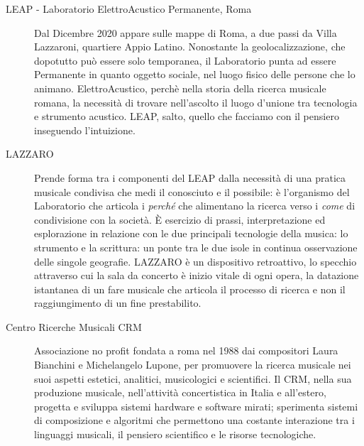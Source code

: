 \documentclass{gs-adonis}
\begin{document}
\begin{description}
  \item[LEAP - Laboratorio ElettroAcustico Permanente, Roma] Dal Dicembre 2020
  appare sulle mappe di Roma, a due passi da Villa Lazzaroni, quartiere Appio
  Latino. Nonostante la geolocalizzazione, che dopotutto può essere solo
  temporanea, il Laboratorio punta ad essere Permanente in quanto oggetto sociale,
  nel luogo fisico delle persone che lo animano. ElettroAcustico, perchè nella
  storia della ricerca musicale romana, la necessità di trovare nell'ascolto
  il luogo d'unione tra tecnologia e strumento acustico. LEAP, salto, quello che
  facciamo con il pensiero inseguendo l'intuizione.

  \item[LAZZARO] Prende forma tra i componenti del LEAP dalla necessità di una
  pratica musicale condivisa che medi il conosciuto e il possibile: è l'organismo
  del Laboratorio che articola i \emph{perché} che alimentano la ricerca verso
  i \emph{come} di condivisione con la società. È esercizio di prassi, interpretazione
  ed esplorazione in relazione con le due principali tecnologie della musica: lo
  strumento e la scrittura: un ponte tra le due isole in continua osservazione
  delle singole geografie. LAZZARO è un dispositivo retroattivo, lo specchio
  attraverso cui la sala da concerto è inizio vitale di ogni opera, la datazione
  istantanea di un fare musicale che articola il processo di ricerca e non il
  raggiungimento di un fine prestabilito.
  \item[Centro Ricerche Musicali CRM] Associazione no profit fondata a roma
  nel 1988 dai compositori Laura Bianchini e Michelangelo Lupone, per promuovere
  la ricerca musicale nei suoi aspetti estetici, analitici, musicologici e scientifici.
  Il CRM, nella sua produzione musicale, nell'attività concertistica in Italia e
  all'estero, progetta e sviluppa sistemi hardware e software mirati; sperimenta
  sistemi di composizione e algoritmi che permettono una costante interazione tra
  i linguaggi musicali, il pensiero scientifico e le risorse tecnologiche.

\end{description}
\end{document}
